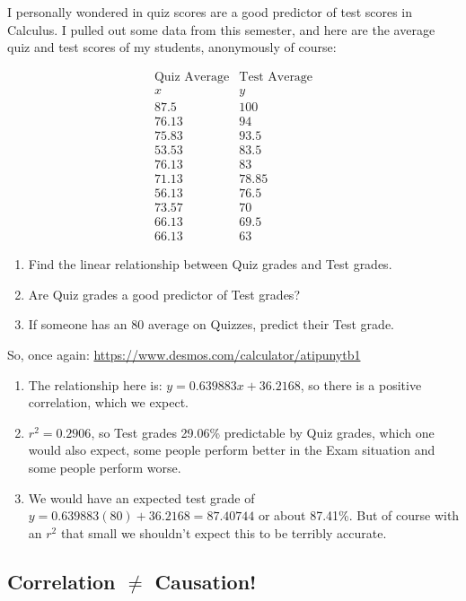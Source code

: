 \begin{example}\label{Example:CorrQuizTest}
I personally wondered in quiz scores are a good predictor of test scores in Calculus.  I pulled out some data from this semester, and here are the average quiz and test scores of my students, anonymously of course:


$$\begin{array}{c|c}
\text{Quiz Average} & \text{Test Average}\\
x&y\\
\hline
87.5&100\\
76.13&94\\
75.83&93.5\\
53.53&83.5\\
76.13&83\\
71.13&78.85\\
56.13&76.5\\
73.57&70\\
66.13&69.5\\
66.13&63
\end{array}$$



\end{example}
\begin{enumerate}
\item Find the linear relationship between Quiz grades and Test grades.
\item Are Quiz grades a good predictor of Test grades?
\item If someone has an 80 average on Quizzes, predict their Test grade.
\end{enumerate}

So, once again:  \url{https://www.desmos.com/calculator/atipunytb1}

\begin{enumerate}
\item The relationship here is: $y=0.639883x+36.2168$, so there is a positive correlation, which we expect.
\item $r^2=0.2906$, so Test grades 29.06\% predictable by Quiz grades, which one would also expect, some people perform better in the Exam situation and some people perform worse.
\item We would have an expected test grade of $y=0.639883(80)+36.2168=87.40744$ or about 87.41\%.  But of course with an $r^2$ that small we shouldn't expect this to be terribly accurate.
\end{enumerate}


\subsection{Correlation $\neq$ Causation!}

